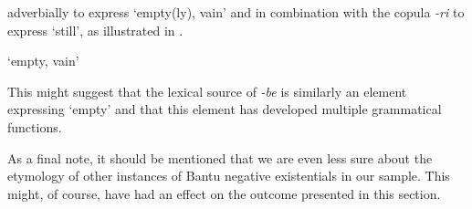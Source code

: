 \documentclass[output=paper]{langscibook}
\begin{document}
adverbially to express `empty(ly), vain' and in combination with the copula
\textit{-ri} to express `still', as illustrated in
.  \begin{exe}
\ex\label{ex:tumbuka-empty-persist}  \begin{xlist} \ex `empty, vain'
\begin{xlist}   \end{xlist}
\end{xlist} \end{exe} 
%
This might suggest that the lexical source of \textit{-be} is similarly an
element expressing `empty' and that this element has developed multiple
grammatical functions.

As a final note, it should be mentioned that we are even less sure about
the etymology of other instances of Bantu negative existentials in our
sample. This might, of course, have had an effect on the outcome presented in this section.
\end{document}
